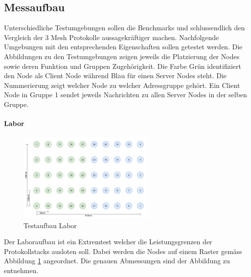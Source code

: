 \newpage
\subsection{Messaufbau}
Unterschiedliche Testumgebungen sollen die Benchmarks und schlussendlich den Vergleich der 3 Mesh Protokolle aussagekräftiger machen. Nachfolgende Umgebungen mit den entsprechenden Eigenschaften sollen getestet werden. Die Abbildungen zu den Testumgebungen zeigen jeweils die Platzierung der Nodes sowie deren Funktion und Gruppen Zugehörigkeit. Die Farbe Grün identifiziert den Node als Client Node während Blau für einen Server Nodes steht. Die Nummerierung zeigt welcher Node zu welcher Adressgruppe gehört. Ein Client Node in Gruppe 1 sendet jeweils Nachrichten zu allen Server Nodes in der selben Gruppe. 
\newline

\paragraph{Labor}
\begin{figure}
	\centering
	\vspace{-20pt}
	\includegraphics[width=0.6\textwidth]{graphics/Testaufbau_Labor.png}
	\caption{Testaufbau Labor}
	\label{fig:TestaufbauLabor}
	\vspace{-10pt}
\end{figure}
Der Laboraufbau ist ein Extremtest welcher die Leistungsgrenzen der Protokollstacks ausloten soll. Dabei werden die Nodes auf einem Raster gemäss Abbildung \ref{fig:TestaufbauLabor} angeordnet. Die genauen Abmessungen sind der Abbildung zu entnehmen.
\vspace{40mm}

